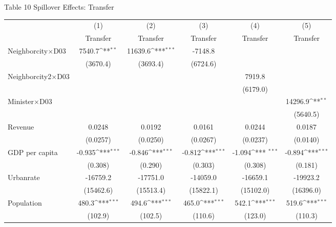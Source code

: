 \documentclass[11pt,a4paper]{article}
\begin{document}
\begin{center}
Table 10 Spillover Effects: Transfer \\
\medskip
\begin{scriptsize}
{
\def\sym#1{\ifmmode^{#1}\else\(^{#1}\)\fi}
\begin{tabular}{l*{5}{c}}
\hline\hline
            &\multicolumn{1}{c}{(1)}&\multicolumn{1}{c}{(2)}&\multicolumn{1}{c}{(3)}&\multicolumn{1}{c}{(4)}&\multicolumn{1}{c}{(5)}\\
            &\multicolumn{1}{c}{Transfer}&\multicolumn{1}{c}{Transfer}&\multicolumn{1}{c}{Transfer}&\multicolumn{1}{c}{Transfer}&\multicolumn{1}{c}{Transfer}\\
\hline
Neighborcity\(\times\)D03        &      7540.7\sym{**}   &   11639.6\sym{***}&          -7148.8  & &   \\
            &    (3670.4)         &    (3693.4)  &      (6724.6)               &     &     \\
[1em]
Neighborcity2\(\times\)D03    &    &    &  &    7919.8 &  \\
          &                   &     &      &       (6179.0)  &   \\
[1em]
Minister\(\times\)D03        &      &    &  &    &   14296.9\sym{**} \\
            &      &      &     &      &    (5640.5)         \\
[1em]
Revenue &      0.0248         &      0.0192        &      0.0161            &        0.0244    &    0.0187       \\
            &    (0.0257)         &    (0.0250)    &    (0.0267)         &   (0.0237)      &    (0.0140)        \\
[1em]
GDP per capita &      -0.935\sym{***}&      -0.846\sym{***} &      -0.812\sym{***} &       -1.094\sym{*** }&      -0.894\sym{***}\\
            &     (0.308)         &     (0.290)     &     (0.303)         &     (0.308)        &     (0.181)          \\
[1em]
Urbanrate   &    -16759.2         &    -17751.0    &    -14059.0           &    -16659.1    &    -19923.2         \\
            &   (15462.6)         &   (15513.4)    &   (15822.1)           &    (15102.0)     &   (16396.0)       \\
[1em]
Population  &       480.3\sym{***}&       494.6\sym{***}&       465.0\sym{***}&       542.1\sym{***}  &       519.6\sym{***}\\
            &     (102.9)         &     (102.5)   &     (110.6)            &      (123.0)    &     (110.3)     \\

\end{tabular}}
\end{scriptsize}
\end{center}
\end{document}
